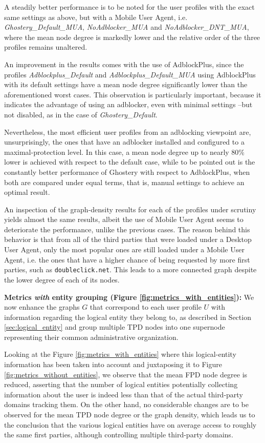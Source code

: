 \documentclass{sig-alternate}
\begin{document}
A steadily better performance is to be noted for the user profiles with the exact same settings as above, but with a Mobile User Agent, i.e. \textit{Ghostery\_Default\_MUA}, \textit{NoAdblocker\_MUA} and \textit{NoAdblocker\_DNT\_MUA}, where the mean node degree is markedly lower and the relative order of the three profiles remains unaltered.

An improvement in the results comes with the use of AdblockPlus, since the profiles \textit{Adblockplus\_Default} and \textit{Adblockplus\_Default\_MUA} using AdblockPlus with its default settings have a mean node degree significantly lower than the aforementioned worst cases. This observation is particularly important, because it indicates the advantage of using an adblocker, even with minimal settings --but not disabled, as in the case of \textit{Ghostery\_Default}.

Nevertheless, the most efficient user profiles from an adblocking viewpoint are, unsurprisingly, the ones that have an adblocker installed and configured to a maximal-protection level. In this case, a mean node degree up to nearly 80\% lower is achieved with respect to the default case, while to be pointed out is the constantly better performance of Ghostery with respect to AdblockPlus, when both are compared under equal terms, that is, manual settings to achieve an optimal result.

An inspection of the graph-density results for each of the profiles under scrutiny yields almost the same results, albeit the use of Mobile User Agent seems to deteriorate the performance, unlike the previous cases. The reason behind this behavior is that from all of the third parties that were loaded under a Desktop User Agent, only the most popular ones are still loaded under a Mobile User Agent, i.e. the ones that have a higher chance of being requested by more first parties, such as \texttt{doubleclick.net}. This leads to a more connected graph despite the lower degree of each of its nodes.

\textbf{Metrics \textit{with} entity grouping (Figure \ref{fig:metrics_with_entities}):} We now enhance the graphs $G$ that correspond to each user profile $U$ with information regarding the logical entity they belong to, as described in Section \ref{sec:logical_entity} and group multiple TPD nodes into one supernode representing their common administrative organization.

Looking at the Figure \ref{fig:metrics_with_entities} where this logical-entity information has been taken into account and juxtaposing it to Figure \ref{fig:metrics_without_entities}, we observe that the mean FPD node degree is reduced, asserting that the number of logical entities potentially collecting information about the user is indeed less than that of the actual third-party domains tracking them. On the other hand, no considerable changes are to be observed for the mean TPD node degree or the graph density, which leads us to the conclusion that the various logical entities have on average access to roughly the same first parties, although controlling multiple third-party domains.
\end{document}
